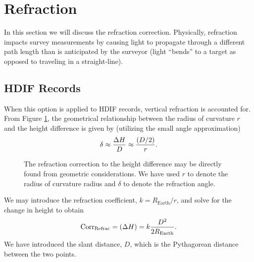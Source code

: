 \section{Refraction}
In this section we will discuss the refraction correction.  Physically, refraction impacts survey measurements by causing light to propagate through a different path length than is anticipated by the surveyor (light ``bends'' to a target as opposed to traveling in a straight-line).
\subsection{HDIF Records}
When this option is applied to HDIF records, vertical refraction is accounted for.  From Figure \ref{Fig:Refrac}, the geometrical relationship between the radius of curvature $r$ and the height difference is given by (utilizing the small angle approximation)
\begin{equation}
\delta \approx \frac{\Delta H}{D} \approx \frac{(D/2)}{r}.
\end{equation}

\begin{figure}[!htbp]
\centering
{}
\caption{The refraction correction to the height difference may be directly found from geometric considerations.  We have used $r$ to denote the radius of curvature radius and $\delta$ to denote the refraction angle.}
\label{Fig:Refrac}
\end{figure}

We may introduce the refraction coefficient, $k=R_{\text{Earth}}/r$, and solve for the change in height to obtain
\begin{equation}
\text{Corr}_{\text{Refrac}} = (\Delta H) = k\frac{D^2}{2R_{\text{Earth}}}.
\end{equation}
We have introduced the slant distance, $D$, which is the Pythagorean distance between the two points.

